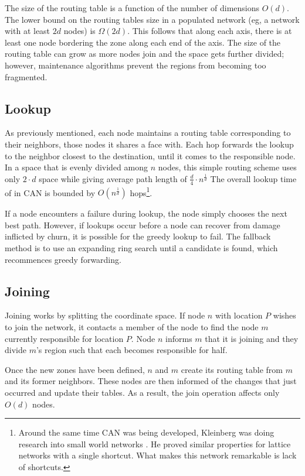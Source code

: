 \documentclass[10pt,letterpaper]{report}
\begin{document}
The size of the routing table is a function of the number of dimensions $O(d)$. 
The lower bound on the routing tables size in a populated network (eg, a network with at least $2d$ nodes) is $\Omega(2d)$.  
This follows that along each axis, there is at least one node bordering the zone along each end of the axis.
The size of the routing table can grow as more nodes join and the space gets further divided; however, maintenance algorithms prevent the regions from becoming too fragmented.



\subsection*{Lookup}
As previously mentioned, each node maintains a routing table corresponding to their neighbors, those nodes it shares a face with.
Each hop forwards the lookup to the neighbor closest to the destination, until it comes to the responsible node.
In a space that is evenly divided among $n$ nodes, this simple routing scheme uses only $2 \cdot d$ space while giving average path length of $\frac{d}{4}\cdot n^{\frac{1}{d}}$
The overall lookup time of in CAN is bounded by $O(n^{\frac{1}{d}})$ hops\footnote{Around the same time CAN was being developed, Kleinberg was doing research into small world networks \cite{kleinberg2000small}.  He proved similar properties for lattice networks with a single shortcut.  What makes this network remarkable is lack of shortcuts.}.

If a node encounters a failure during lookup, the node simply chooses the next best path.
However, if lookups occur before a node can recover from damage inflicted by churn, it is possible for the greedy lookup to fail.
The fallback method is to use an expanding ring search until a candidate is found, which recommences greedy forwarding.

\subsection*{Joining}
Joining works by splitting the coordinate space.  
If node $n$ with location $P$ wishes to join the network, it contacts a member of the node to find the node $m$ currently responsible for location $P$.
Node $n$ informs $m$ that it is joining and they divide $m$'s region such that each becomes responsible for half.


Once the new zones have been defined, $n$ and $m$ create its routing table from $m$ and its former neighbors.
These nodes are then informed of the changes that just occurred and update their tables.
As a result, the join operation affects only $O(d)$ nodes.  
\end{document}
